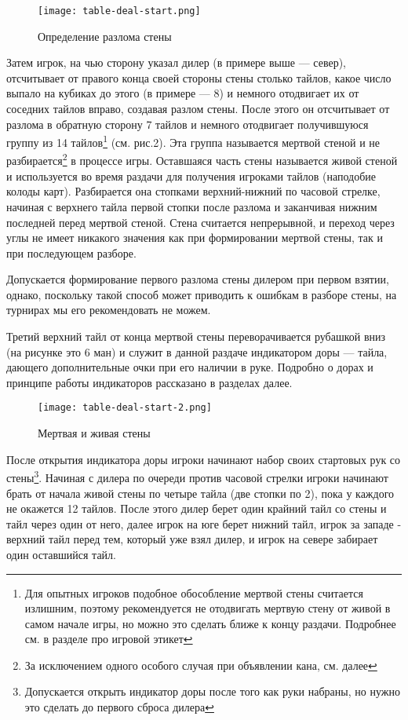 \begin{figure}[H]
	\centering
	\texttt{[image: table-deal-start.png]}
	\caption{Определение разлома стены}
\end{figure}

Затем игрок, на чью сторону указал дилер (в примере выше --- север), отсчитывает от правого конца своей стороны стены столько тайлов, какое число выпало на кубиках до этого (в примере --- 8) и немного отодвигает их от соседних тайлов вправо, создавая разлом стены. После этого он отсчитывает от разлома в обратную сторону 7 тайлов и немного отодвигает получившуюся группу из 14 тайлов\footnote{Для опытных игроков подобное обособление мертвой стены считается излишним, поэтому рекомендуется не отодвигать мертвую стену от живой в самом начале игры, но можно это сделать ближе к концу раздачи. Подробнее см. в разделе про игровой этикет} (см. рис.2). Эта группа называется мертвой стеной и не разбирается\footnote{За исключением одного особого случая при объявлении кана, см. далее} в процессе игры. Оставшаяся часть стены называется живой стеной и используется во время раздачи для получения игроками тайлов (наподобие колоды карт). Разбирается она стопками верхний-нижний по часовой стрелке, начиная с верхнего тайла первой стопки после разлома и заканчивая нижним последней перед мертвой стеной. Стена считается непрерывной, и переход через углы не имеет никакого значения как при формировании мертвой стены, так и при последующем разборе.

Допускается формирование первого разлома стены дилером при первом взятии, однако, поскольку такой способ может приводить к ошибкам в разборе стены, на турнирах мы его рекомендовать не можем.

Третий верхний тайл от конца мертвой стены переворачивается рубашкой вниз (на рисунке это 6 ман) и служит в данной раздаче индикатором доры --- тайла, дающего дополнительные очки при его наличии в руке. Подробно о дорах и принципе работы индикаторов рассказано в разделах далее.

\begin{figure}[H]
	\centering
	\texttt{[image: table-deal-start-2.png]}
	\caption{Мертвая и живая стены}
\end{figure}

После открытия индикатора доры игроки начинают набор своих стартовых рук со стены\footnote{Допускается открыть индикатор доры после того как руки набраны, но нужно это сделать до первого сброса дилера}. Начиная с дилера по очереди против часовой стрелки игроки начинают брать от начала живой стены по четыре тайла (две стопки по 2), пока у каждого не окажется 12 тайлов.
После этого дилер берет один крайний тайл со стены и тайл через один от него, далее игрок на юге берет нижний тайл, игрок за западе - верхний тайл перед тем, который уже взял дилер, и игрок на севере забирает один оставшийся тайл.

